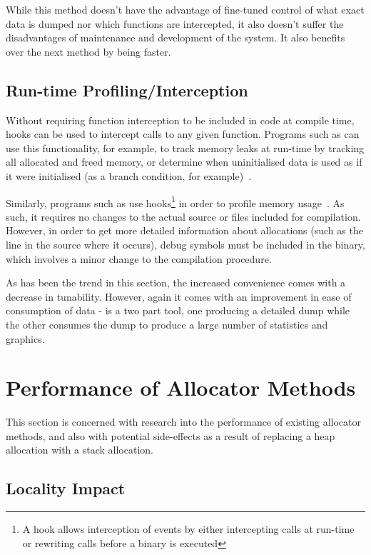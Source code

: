 While this method doesn't have the advantage of fine-tuned control of what exact data is dumped nor which functions are intercepted, it also doesn't suffer the disadvantages of maintenance and development of the system. It also benefits over the next method by being faster.

\subsection{Run-time Profiling/Interception}

Without requiring function interception to be included in code at compile time, hooks can be used to intercept calls to any given function. Programs such as  can use this functionality, for example, to track memory leaks at run-time by tracking all allocated and freed memory, or determine when uninitialised data is used as if it were initialised (as a branch condition, for example)~\cite{valgrind}.

Similarly, programs such as  use hooks\footnote{A hook allows interception of events by either intercepting calls at run-time or rewriting calls before a binary is executed} in order to profile memory usage~\cite{heaptrack}. As such, it requires no changes to the actual source or files included for compilation. However, in order to get more detailed information about allocations (such as the line in the source where it occurs), debug symbols must be included in the binary, which involves a minor change to the compilation procedure.

As has been the trend in this section, the increased convenience comes with a decrease in tunability. However, again it comes with an improvement in ease of consumption of data -  is a two part tool, one producing a detailed dump while the other consumes the dump to produce a large number of statistics and graphics.

\section{Performance of Allocator Methods}

This section is concerned with research into the performance of existing allocator methods, and also with potential side-effects as a result of replacing a heap allocation with a stack allocation.

\subsection{Locality Impact}

